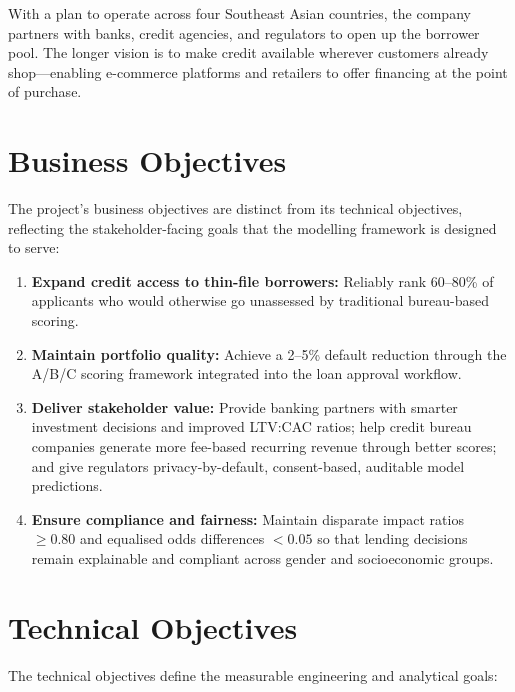 With a plan to operate across four Southeast Asian countries, the company partners with banks, credit agencies, and regulators to open up the borrower pool. The longer vision is to make credit available wherever customers already shop---enabling e-commerce platforms and retailers to offer financing at the point of purchase.

\section{Business Objectives}
\label{sec:business_objectives}

The project's business objectives are distinct from its technical objectives, reflecting the stakeholder-facing goals that the modelling framework is designed to serve:

\begin{enumerate}
    \item \textbf{Expand credit access to thin-file borrowers:} Reliably rank 60--80\% of applicants who would otherwise go unassessed by traditional bureau-based scoring.
    \item \textbf{Maintain portfolio quality:} Achieve a 2--5\% default reduction through the A/B/C scoring framework integrated into the loan approval workflow.
    \item \textbf{Deliver stakeholder value:} Provide banking partners with smarter investment decisions and improved \ac{LTV}:\ac{CAC} ratios; help credit bureau companies generate more fee-based recurring revenue through better scores; and give regulators privacy-by-default, consent-based, auditable model predictions.
    \item \textbf{Ensure compliance and fairness:} Maintain disparate impact ratios $\geq 0.80$ and equalised odds differences $< 0.05$ so that lending decisions remain explainable and compliant across gender and socioeconomic groups.
\end{enumerate}

\section{Technical Objectives}
\label{sec:technical_objectives}

The technical objectives define the measurable engineering and analytical goals:

